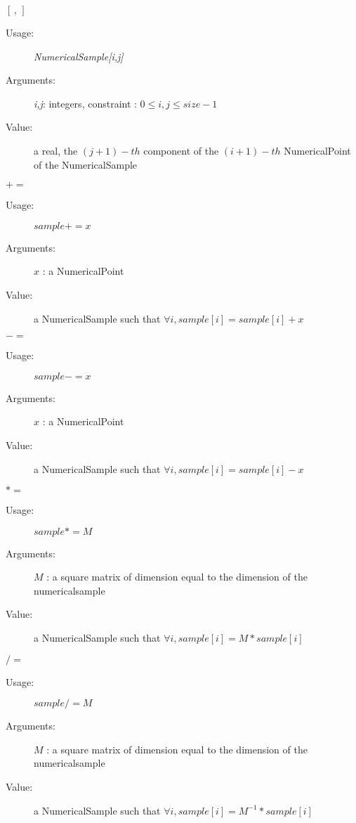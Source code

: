 \begin{description}
\begin{description}
\item $[\,, \,]$
\begin{description}
\item[Usage:] \textit{NumericalSample[i,j]}
\item[Arguments:] \textit{i,j}: integers, constraint : $ 0 \leq i,j \leq size -1$
\item[Value:] a real, the $(j+1)-th$ component of the  $(i+1)-th$ NumericalPoint of the NumericalSample
\end{description}
\bigskip


\item $+=$
\begin{description}
\item[Usage:] $sample += x$
\item[Arguments:] $x$ : a NumericalPoint
\item[Value:] a NumericalSample  such that $\forall i, sample[i] = sample[i] + x$
\end{description}
\bigskip

\item $-=$
\begin{description}
\item[Usage:] $sample -= x$
\item[Arguments:] $x$ : a NumericalPoint
\item[Value:] a NumericalSample  such that $\forall i, sample[i] = sample[i] - x$
\end{description}
\bigskip

\item $*=$
\begin{description}
\item[Usage:] $sample *= M$
\item[Arguments:] $M$ : a square matrix of dimension equal to the dimension of the numericalsample
\item[Value:] a NumericalSample such that $\forall i, sample[i] = M*sample[i]$
\end{description}
\bigskip

\item $/=$
\begin{description}
\item[Usage:] $sample /= M$
\item[Arguments:] $M$ : a square matrix of dimension equal to the dimension of the numericalsample
\item[Value:] a NumericalSample  such that $\forall i, sample[i] = M^{-1}*sample[i]$
\end{description}
\bigskip



\end{description}
\end{description}
